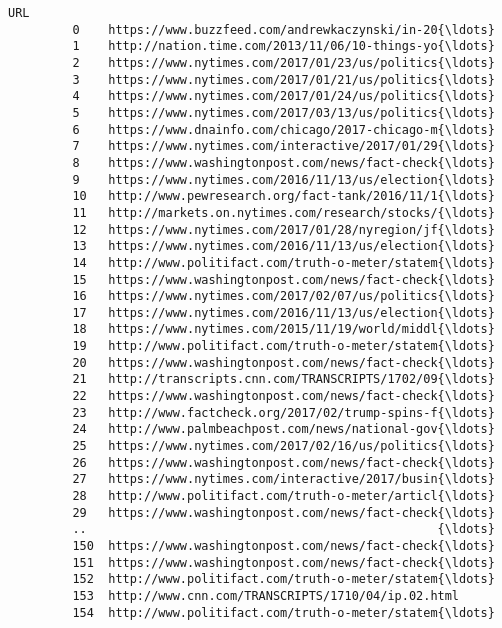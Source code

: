 \documentclass[11pt]{article}
\begin{document}
\begin{Verbatim}[commandchars=\\\{\}]
                                                            URL  
         0    https://www.buzzfeed.com/andrewkaczynski/in-20{\ldots}  
         1    http://nation.time.com/2013/11/06/10-things-yo{\ldots}  
         2    https://www.nytimes.com/2017/01/23/us/politics{\ldots}  
         3    https://www.nytimes.com/2017/01/21/us/politics{\ldots}  
         4    https://www.nytimes.com/2017/01/24/us/politics{\ldots}  
         5    https://www.nytimes.com/2017/03/13/us/politics{\ldots}  
         6    https://www.dnainfo.com/chicago/2017-chicago-m{\ldots}  
         7    https://www.nytimes.com/interactive/2017/01/29{\ldots}  
         8    https://www.washingtonpost.com/news/fact-check{\ldots}  
         9    https://www.nytimes.com/2016/11/13/us/election{\ldots}  
         10   http://www.pewresearch.org/fact-tank/2016/11/1{\ldots}  
         11   http://markets.on.nytimes.com/research/stocks/{\ldots}  
         12   https://www.nytimes.com/2017/01/28/nyregion/jf{\ldots}  
         13   https://www.nytimes.com/2016/11/13/us/election{\ldots}  
         14   http://www.politifact.com/truth-o-meter/statem{\ldots}  
         15   https://www.washingtonpost.com/news/fact-check{\ldots}  
         16   https://www.nytimes.com/2017/02/07/us/politics{\ldots}  
         17   https://www.nytimes.com/2016/11/13/us/election{\ldots}  
         18   https://www.nytimes.com/2015/11/19/world/middl{\ldots}  
         19   http://www.politifact.com/truth-o-meter/statem{\ldots}  
         20   https://www.washingtonpost.com/news/fact-check{\ldots}  
         21   http://transcripts.cnn.com/TRANSCRIPTS/1702/09{\ldots}  
         22   https://www.washingtonpost.com/news/fact-check{\ldots}  
         23   http://www.factcheck.org/2017/02/trump-spins-f{\ldots}  
         24   http://www.palmbeachpost.com/news/national-gov{\ldots}  
         25   https://www.nytimes.com/2017/02/16/us/politics{\ldots}  
         26   https://www.washingtonpost.com/news/fact-check{\ldots}  
         27   https://www.nytimes.com/interactive/2017/busin{\ldots}  
         28   http://www.politifact.com/truth-o-meter/articl{\ldots}  
         29   https://www.washingtonpost.com/news/fact-check{\ldots}  
         ..                                                 {\ldots}  
         150  https://www.washingtonpost.com/news/fact-check{\ldots}  
         151  https://www.washingtonpost.com/news/fact-check{\ldots}  
         152  http://www.politifact.com/truth-o-meter/statem{\ldots}  
         153  http://www.cnn.com/TRANSCRIPTS/1710/04/ip.02.html  
         154  http://www.politifact.com/truth-o-meter/statem{\ldots}  

\end{Verbatim}
\end{document}
